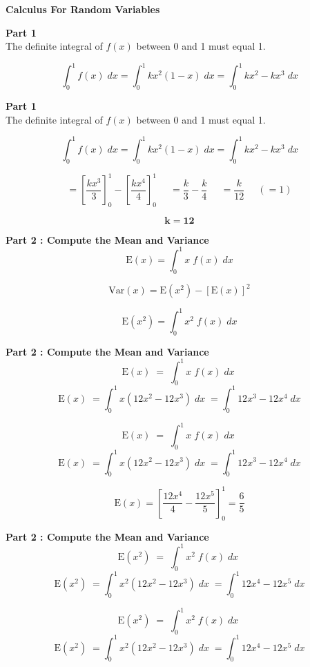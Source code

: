\documentclass[]{report}
\begin{document}

\noindent \textbf{Calculus For Random Variables}

\textbf{Part 1}\\
The definite integral of $f(x)$ between 0 and 1 must equal 1.

\[ \int^1_0 f(x)\;dx = \int^1_0 kx^2(1-x)\;dx = \int^1_0 kx^2-kx^3\;dx  \]



\textbf{Part 1}\\
The definite integral of $f(x)$ between 0 and 1 must equal 1.

\[ \int^1_0 f(x)\;dx = \int^1_0 kx^2(1-x)\;dx = \int^1_0 kx^2-kx^3\;dx  \]

\[ = \left[\frac{kx^3}{3} \right]^1_0  - \left[\frac{kx^4}{4} \right]^1_0
\phantom{sce} = \frac{k}{3} - \frac{k}{4} \phantom{sce} = \frac{k}{12} \phantom{sce}(= 1)
\] 

\[ \boldsymbol{k = 12}\]

\textbf{Part 2 :  Compute the Mean and Variance}\\
\[ \mathrm{E}(x) = \int^1_0 x\; f(x)\;dx  \]

\[ \mathrm{Var}(x) = \mathrm{E}(x^2)  - [\mathrm{E}(x)]^2   \]

\[ \mathrm{E}(x^2) = \int^1_0 x^2\; f(x)\;dx \]

\textbf{Part 2 :  Compute the Mean and Variance}\\
\[ \mathrm{E}(x) \; = \; \int^1_0 x\; f(x)\;dx \;   \]
\[ \mathrm{E}(x) \; = \int^1_0 x(12x^2-12x^3)\;dx  \; = \int^1_0 12x^3-12x^4\;dx  \]



\[ \mathrm{E}(x) \; = \; \int^1_0 x\; f(x)\;dx \;   \]
\[ \mathrm{E}(x) \; = \int^1_0 x(12x^2-12x^3)\;dx  \; = \int^1_0 12x^3-12x^4\;dx  \]

\[ \mathrm{E}(x)  = \left[\frac{12x^4}{4}-\frac{12x^5}{5} \right]^1_0 = \frac{6}{5} \]


\textbf{Part 2 :  Compute the Mean and Variance}\\
\[ \mathrm{E}(x^2) \; = \; \int^1_0 x^2\; f(x)\;dx \;   \]
\[ \mathrm{E}(x^2) \; = \int^1_0 x^2(12x^2-12x^3)\;dx  \; = \int^1_0 12x^4-12x^5\;dx  \]


\[ \mathrm{E}(x^2) \; = \; \int^1_0 x^2\; f(x)\;dx \;   \]
\[ \mathrm{E}(x^2) \; = \int^1_0 x^2(12x^2-12x^3)\;dx  \; = \int^1_0 12x^4-12x^5\;dx  \]
\end{document}
